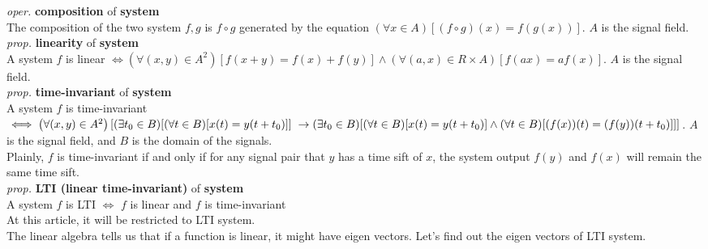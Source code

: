 \documentclass{article}
\newcommand{\sd}[1]{{\left(#1\right)}}
\newcommand{\md}[1]{{\left[#1\right]}}
\newcommand{\oper}[2]{\emph{oper.} \textbf{#1} of \textbf{#2}}
\newcommand{\prop}[2]{\emph{prop.} \textbf{#1} of \textbf{#2}}
\begin{document}
\oper{composition}{system}\\
The composition of the two system $f,g$ is $f\circ g$ generated by the equation $\sd{\forall x \in A}\md{\sd{f\circ g}\sd{x} = f\sd{g\sd{x}}}$. $A$ is the signal field.\\
\prop{linearity}{system}\\
A system $f$ is linear $\iff \sd{\forall \sd{x,y} \in A^2}\md{f\sd{x+y} = f\sd{x}+f\sd{y}}\land\sd{\forall \sd{a,x} \in R\times A}\md{f\sd{ax} = af\sd{x}}$. $A$ is the signal field.\\
\prop{time-invariant}{system}\\
A system $f$ is time-invariant \\
\begin{math}\iff \sd{\forall \sd{x,y} \in A^2}\left[\sd{\exists t_0 \in B}\md{\sd{\forall t \in B}\md{x\sd{t} = y\sd{t+t_0}}} \right.\\ \left. \to \sd{\exists t_0 \in B}\md{\sd{\forall t \in B}\md{x\sd{t} = y\sd{t+t_0}}\land\sd{\forall t \in B}\md{\sd{f\sd{x}}\sd{t} = \sd{f\sd{y}}\sd{t+t_0}}}\right]\end{math}.
$A$ is the signal field, and $B$ is the domain of the signals.\\
Plainly, $f$ is time-invariant if and only if for any signal pair that $y$ has a time sift of $x$, the system output $f\sd{y}$ and $f\sd{x}$ will remain the same time sift.\\
\prop{LTI (linear time-invariant)}{system}\\
A system $f$ is LTI $\iff$ $f$ is linear and $f$ is time-invariant\\
At this article, it will be restricted to LTI system.\\
The linear algebra tells us that if a function is linear, it might have eigen vectors. Let's find out the eigen vectors of LTI system.\\
\end{document}
